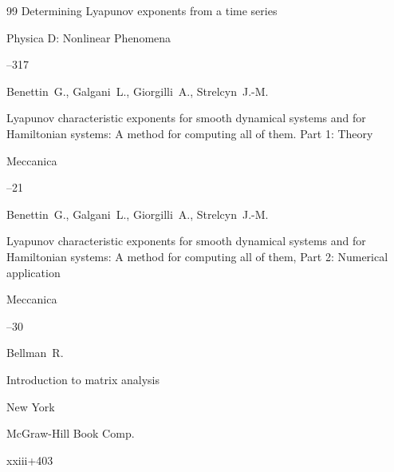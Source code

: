 \begin{thebibliography}{99}
\paper Determining Lyapunov exponents from a time series

\jour Physica D: Nonlinear Phenomena




--317





\by Benettin~G., Galgani~L., Giorgilli~A., Strelcyn~J.-M.

\paper Lyapunov characteristic exponents for smooth dynamical systems and for Hamiltonian systems: A method for computing all of them. Part 1: Theory

\jour Meccanica




--21







\by Benettin~G., Galgani~L., Giorgilli~A., Strelcyn~J.-M.

\paper Lyapunov characteristic exponents for smooth dynamical systems and for Hamiltonian systems: A method for computing all of them, Part 2: Numerical application

\jour Meccanica




--30





\by Bellman~R.

\book Introduction to matrix analysis


\publaddr New York 

\publ McGraw-Hill Book Comp.

\totalpages xxiii+403






\end{thebibliography}
